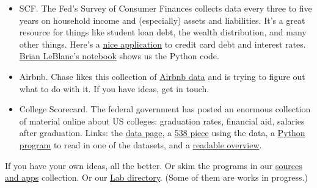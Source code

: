 \documentclass[11pt]{article}
\begin{document}
\begin{itemize}
\begin{itemize}
\item SCF.  The Fed's Survey of Consumer Finances collects data every three to five years
on household income and (especially) assets and liabilities.
It's a great resource for things like student loan debt, the wealth distribution,
and many other things.
Here's a
\href{http://www.npr.org/sections/money/2015/08/14/431263285/13-years-of-american-credit-cards-in-one-graph}
{nice application}
to credit card debt and interest rates.
\href{https://github.com/DaveBackus/Data_Bootcamp/blob/master/Code/Lab/SCF_data_experiment_Brian.ipynb}
{Brian LeBlanc's notebook}
shows us the Python code.

\item Airbnb.
Chase likes this collection of \href{http://insideairbnb.com/index.html}{Airbnb data}
and is trying to figure out what to do with it.  If you have ideas, get in touch.

\item {College Scorecard.}
The federal government has posted an enormous collection of material online
about US colleges:  graduation rates, financial aid, salaries after graduation.
Links:  the \href{https://collegescorecard.ed.gov/data/}{data page},
a \href{http://fivethirtyeight.com/features/shut-up-about-harvard/}{538 piece} using the data, 
a \href{https://github.com/DaveBackus/Data_Bootcamp/blob/master/Code/Lab/College_Scorecard_data_input.py}
{Python program} to read in one of the datasets,
and a \href{http://www.vox.com/2015/9/12/9314695/college-scorecard-earnings}{readable overview}.

\end{itemize}

If you have your own ideas, all the better.
Or skim the programs in our
\href{https://docs.google.com/document/d/1L2ZDKFyyqfOrCGbNcCIE9mmgap4tjkTNuw32hK4c6BI/edit?usp=sharing}
{sources and apps} collection.
Or our
\href{https://github.com/DaveBackus/Data_Bootcamp/tree/master/Code/Lab}{Lab directory}.
(Some of them are works in progress.)


\begin{comment}
\item {\bf IPython notebook of data input chapter.\/}
Create a notebook that goes through the material of the data input chapter of the book,
or perhaps one of the other early chapters.
The result should be a notebook that allows others to teach themselves.
Include blank cells for exercises.
\end{comment}
\end{itemize}



\end{document}
